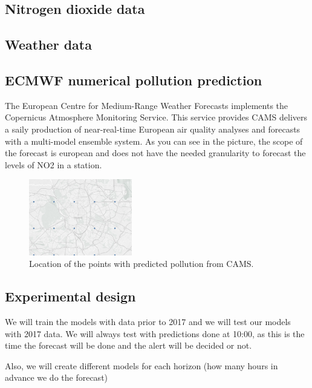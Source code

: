 \documentclass[a4paper,twocolumn,5p]{elsarticle}
\begin{document}
\subsection{Nitrogen dioxide data}
\label{sec:no2}


\subsection{Weather data}
\label{sec:weather-data}

\subsection{ECMWF numerical pollution prediction}
\label{sec:ecmwf-numer-poll}

The European Centre for Medium-Range Weather Forecasts implements the Copernicus Atmosphere Monitoring Service.
This service provides CAMS delivers a saily production of near-real-time European air quality analyses and forecasts 
with a multi-model ensemble system. 
As you can see in the picture, the scope of the forecast is european and does not have the needed granularity to forecast 
the levels of NO2 in a station.

\begin{figure}
  \caption{Location of the points with predicted pollution from CAMS.}
  \centering
  \includegraphics[width=0.4\textwidth]{camspoints}
\end{figure}


\subsection{Experimental design}
\label{sec:experimental-design}

We will train the models with data prior to 2017 and we will test our models with 2017 data. We will always test with 
predictions done at 10:00, as this is the time the forecast will be done and the alert will be decided or not.

Also, we will create different models for each horizon (how many hours in advance we do the forecast)
\end{document}
